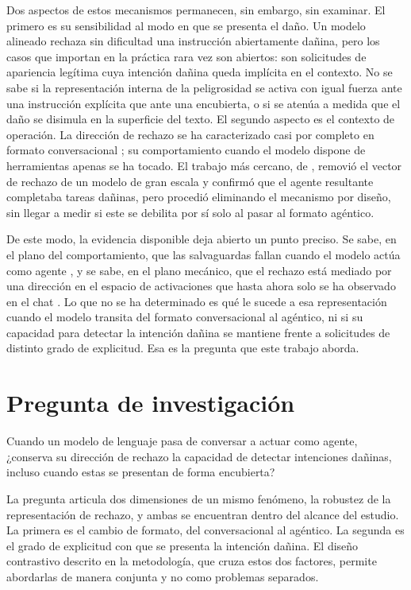 \documentclass[12pt,a4paper]{article}
\newcommand{\parencite}[1]{\citep{#1}}
\newcommand{\textcite}[1]{\citet{#1}}
\begin{document}
Dos aspectos de estos mecanismos permanecen, sin embargo, sin examinar. El primero es su sensibilidad al modo en que se presenta el daño. Un modelo alineado rechaza sin dificultad una instrucción abiertamente dañina, pero los casos que importan en la práctica rara vez son abiertos: son solicitudes de apariencia legítima cuya intención dañina queda implícita en el contexto. No se sabe si la representación interna de la peligrosidad se activa con igual fuerza ante una instrucción explícita que ante una encubierta, o si se atenúa a medida que el daño se disimula en la superficie del texto. El segundo aspecto es el contexto de operación. La dirección de rechazo se ha caracterizado casi por completo en formato conversacional \parencite{arditi2024}; su comportamiento cuando el modelo dispone de herramientas apenas se ha tocado. El trabajo más cercano, de \textcite{lermen2024}, removió el vector de rechazo de un modelo de gran escala y confirmó que el agente resultante completaba tareas dañinas, pero procedió eliminando el mecanismo por diseño, sin llegar a medir si este se debilita por sí solo al pasar al formato agéntico.

De este modo, la evidencia disponible deja abierto un punto preciso. Se sabe, en el plano del comportamiento, que las salvaguardas fallan cuando el modelo actúa como agente \parencite{andriushchenko2024}, y se sabe, en el plano mecánico, que el rechazo está mediado por una dirección en el espacio de activaciones que hasta ahora solo se ha observado en el chat \parencite{arditi2024}. Lo que no se ha determinado es qué le sucede a esa representación cuando el modelo transita del formato conversacional al agéntico, ni si su capacidad para detectar la intención dañina se mantiene frente a solicitudes de distinto grado de explicitud. Esa es la pregunta que este trabajo aborda.

\section{Pregunta de investigación}

\justifying

Cuando un modelo de lenguaje pasa de conversar a actuar como agente, ¿conserva su dirección de rechazo la capacidad de detectar intenciones dañinas, incluso cuando estas se presentan de forma encubierta?

La pregunta articula dos dimensiones de un mismo fenómeno, la robustez de la representación de rechazo, y ambas se encuentran dentro del alcance del estudio. La primera es el cambio de formato, del conversacional al agéntico. La segunda es el grado de explicitud con que se presenta la intención dañina. El diseño contrastivo descrito en la metodología, que cruza estos dos factores, permite abordarlas de manera conjunta y no como problemas separados.
\end{document}
